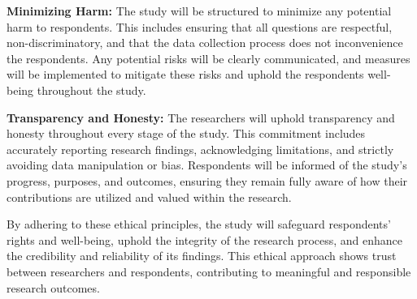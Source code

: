 	\textbf{Minimizing Harm:} The study will be structured to minimize any potential harm to respondents. This includes ensuring that all questions are respectful, non-discriminatory, and that the data collection process does not inconvenience the respondents. Any potential risks will be clearly communicated, and measures will be implemented to mitigate these risks and uphold the respondents well-being throughout the study.
	
	\textbf{Transparency and Honesty: } The researchers will uphold transparency and honesty throughout every stage of the study. This commitment includes accurately reporting research findings, acknowledging limitations, and strictly avoiding data manipulation or bias. Respondents will be informed of the study's progress, purposes, and outcomes, ensuring they remain fully aware of how their contributions are utilized and valued within the research.
	
	By adhering to these ethical principles, the study will safeguard respondents' rights and well-being, uphold the integrity of the research process, and enhance the credibility and reliability of its findings. This ethical approach shows trust between researchers and respondents, contributing to meaningful and responsible research outcomes.
